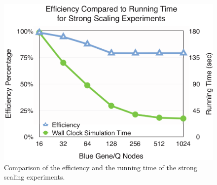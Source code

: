 \begin{figure}[t!]
\centering
\includegraphics[width=\linewidth]{result_img/efficiency_v_runtime.pdf}
\caption{
	Comparison of the efficiency and the running time of the strong scaling experiments.
}
\label{fig:eff}
\end{figure}
